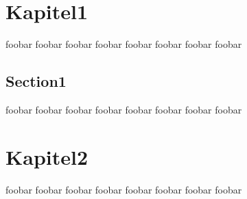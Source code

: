 \chapter{Kapitel1}
\label{cha:Kapitel1}
foobar foobar foobar foobar foobar foobar foobar foobar
\section{Section1}
\label{cha:Section1}
foobar foobar foobar foobar foobar foobar foobar foobar
\chapter{Kapitel2}
foobar foobar foobar foobar foobar foobar foobar foobar
